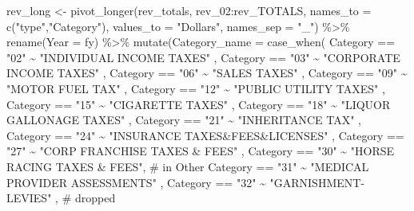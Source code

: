 \documentclass[
  letterpaper,
  DIV=11,
  numbers=noendperiod]{scrreport}
\newenvironment{Shaded}{\begin{snugshade}}{\end{snugshade}}
\newcommand{\AttributeTok}[1]{\textcolor[rgb]{0.40,0.45,0.13}{#1}}
\newcommand{\CommentTok}[1]{\textcolor[rgb]{0.37,0.37,0.37}{#1}}
\newcommand{\FunctionTok}[1]{\textcolor[rgb]{0.28,0.35,0.67}{#1}}
\newcommand{\NormalTok}[1]{\textcolor[rgb]{0.00,0.23,0.31}{#1}}
\newcommand{\OtherTok}[1]{\textcolor[rgb]{0.00,0.23,0.31}{#1}}
\newcommand{\SpecialCharTok}[1]{\textcolor[rgb]{0.37,0.37,0.37}{#1}}
\newcommand{\StringTok}[1]{\textcolor[rgb]{0.13,0.47,0.30}{#1}}
\begin{document}
\begin{Shaded}
\begin{Highlighting}[]
\NormalTok{rev\_long }\OtherTok{\textless{}{-}} \FunctionTok{pivot\_longer}\NormalTok{(rev\_totals, rev\_02}\SpecialCharTok{:}\NormalTok{rev\_TOTALS, }\AttributeTok{names\_to =} \FunctionTok{c}\NormalTok{(}\StringTok{"type"}\NormalTok{,}\StringTok{"Category"}\NormalTok{), }\AttributeTok{values\_to =} \StringTok{"Dollars"}\NormalTok{, }\AttributeTok{names\_sep =} \StringTok{"\_"}\NormalTok{) }\SpecialCharTok{\%\textgreater{}\%} 
  \FunctionTok{rename}\NormalTok{(}\AttributeTok{Year =}\NormalTok{ fy) }\SpecialCharTok{\%\textgreater{}\%}
  \FunctionTok{mutate}\NormalTok{(}\AttributeTok{Category\_name =} \FunctionTok{case\_when}\NormalTok{(}
\NormalTok{    Category }\SpecialCharTok{==} \StringTok{"02"} \SpecialCharTok{\textasciitilde{}} \StringTok{"INDIVIDUAL INCOME TAXES"}\NormalTok{ ,}
\NormalTok{    Category }\SpecialCharTok{==} \StringTok{"03"} \SpecialCharTok{\textasciitilde{}} \StringTok{"CORPORATE INCOME TAXES"}\NormalTok{ ,}
\NormalTok{    Category }\SpecialCharTok{==} \StringTok{"06"} \SpecialCharTok{\textasciitilde{}} \StringTok{"SALES TAXES"}\NormalTok{ ,}
\NormalTok{    Category }\SpecialCharTok{==} \StringTok{"09"} \SpecialCharTok{\textasciitilde{}} \StringTok{"MOTOR FUEL TAX"}\NormalTok{ ,}
\NormalTok{    Category }\SpecialCharTok{==} \StringTok{"12"} \SpecialCharTok{\textasciitilde{}} \StringTok{"PUBLIC UTILITY TAXES"}\NormalTok{ ,}
\NormalTok{    Category }\SpecialCharTok{==} \StringTok{"15"} \SpecialCharTok{\textasciitilde{}} \StringTok{"CIGARETTE TAXES"}\NormalTok{ ,}
\NormalTok{    Category }\SpecialCharTok{==} \StringTok{"18"} \SpecialCharTok{\textasciitilde{}} \StringTok{"LIQUOR GALLONAGE TAXES"}\NormalTok{ ,}
\NormalTok{    Category }\SpecialCharTok{==} \StringTok{"21"} \SpecialCharTok{\textasciitilde{}} \StringTok{"INHERITANCE TAX"}\NormalTok{ ,}
\NormalTok{    Category }\SpecialCharTok{==} \StringTok{"24"} \SpecialCharTok{\textasciitilde{}} \StringTok{"INSURANCE TAXES\&FEES\&LICENSES"}\NormalTok{ ,}
\NormalTok{    Category }\SpecialCharTok{==} \StringTok{"27"} \SpecialCharTok{\textasciitilde{}} \StringTok{"CORP FRANCHISE TAXES \& FEES"}\NormalTok{ ,}
\NormalTok{    Category }\SpecialCharTok{==} \StringTok{"30"} \SpecialCharTok{\textasciitilde{}} \StringTok{"HORSE RACING TAXES \& FEES"}\NormalTok{,  }\CommentTok{\# in Other}
\NormalTok{    Category }\SpecialCharTok{==} \StringTok{"31"} \SpecialCharTok{\textasciitilde{}} \StringTok{"MEDICAL PROVIDER ASSESSMENTS"}\NormalTok{ ,}
\NormalTok{    Category }\SpecialCharTok{==} \StringTok{"32"} \SpecialCharTok{\textasciitilde{}} \StringTok{"GARNISHMENT{-}LEVIES"}\NormalTok{ , }\CommentTok{\# dropped}

\end{Highlighting}
\end{Shaded}
\end{document}
